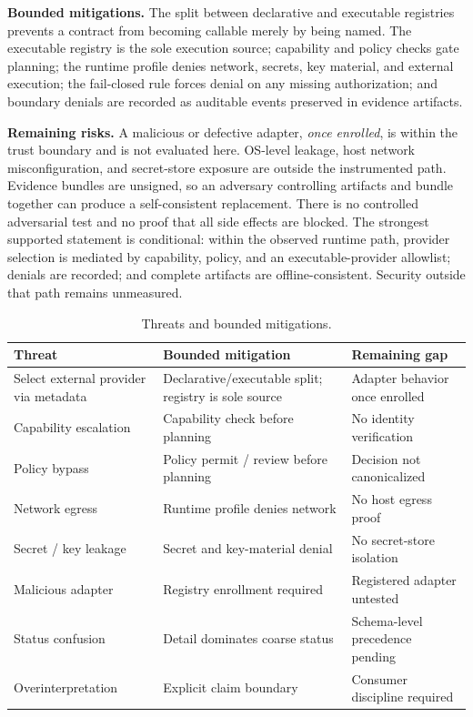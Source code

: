 \documentclass[conference]{IEEEtran}
\begin{document}
\noindent\textbf{Bounded mitigations.} The split between declarative and executable
registries prevents a contract from becoming callable merely by being named. The
executable registry is the sole execution source; capability and policy checks gate
planning; the runtime profile denies network, secrets, key material, and external
execution; the fail-closed rule forces denial on any missing authorization; and boundary
denials are recorded as auditable events preserved in evidence artifacts.

\noindent\textbf{Remaining risks.} A malicious or defective adapter, \emph{once enrolled},
is within the trust boundary and is not evaluated here. OS-level leakage, host network
misconfiguration, and secret-store exposure are outside the instrumented path. Evidence
bundles are unsigned, so an adversary controlling artifacts and bundle together can produce
a self-consistent replacement. There is no controlled adversarial test and no proof that
all side effects are blocked. The strongest supported statement is conditional: within the
observed runtime path, provider selection is mediated by capability, policy, and an
executable-provider allowlist; denials are recorded; and complete artifacts are
offline-consistent. Security outside that path remains unmeasured.

\begin{table}[t]
\centering
\caption{Threats and bounded mitigations.}
\label{tab:threats}
\renewcommand{\arraystretch}{1.25}
\scriptsize
\setlength{\tabcolsep}{3pt}
\begin{tabular}{@{}L{0.27\columnwidth}L{0.30\columnwidth}L{0.29\columnwidth}@{}}
\toprule
\textbf{Threat} & \textbf{Bounded mitigation} & \textbf{Remaining gap} \\
\midrule
Select external provider via metadata & Declarative/executable split; registry is sole source & Adapter behavior once enrolled \\
Capability escalation & Capability check before planning & No identity verification \\
Policy bypass & Policy permit / review before planning & Decision not canonicalized \\
Network egress & Runtime profile denies network & No host egress proof \\
Secret / key leakage & Secret and key-material denial & No secret-store isolation \\
Malicious adapter & Registry enrollment required & Registered adapter untested \\
Status confusion & Detail dominates coarse status & Schema-level precedence pending \\
Overinterpretation & Explicit claim boundary & Consumer discipline required \\
\bottomrule
\end{tabular}
\end{table}
\end{document}
